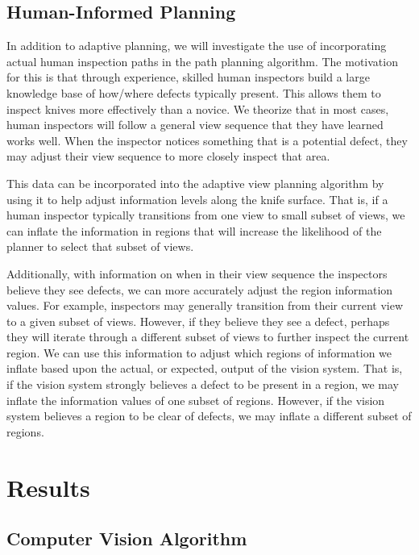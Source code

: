\documentclass[letterpaper, 10 pt, conference]{ieeeconf}  %
\begin{document}
\subsection{Human-Informed Planning}

In addition to adaptive planning, we will investigate the use of incorporating actual human inspection paths in the path planning algorithm. The motivation for this is that through experience, skilled human inspectors build a large knowledge base of how/where defects typically present. This allows them to inspect knives more effectively than a novice. We theorize that in most cases, human inspectors will follow a general view sequence that they have learned works well. When the inspector notices something that is a potential defect, they may adjust their view sequence to more closely inspect that area.

This data can be incorporated into the adaptive view planning algorithm by using it to help adjust information levels along the knife surface. That is, if a human inspector typically transitions from one view to small subset of views, we can inflate the information in regions that will increase the likelihood of the planner to select that subset of views.

Additionally, with information on when in their view sequence the inspectors believe they see defects, we can more accurately adjust the region information values. For example, inspectors may generally transition from their current view to a given subset of views. However, if they believe they see a defect, perhaps they will iterate through a different subset of views to further inspect the current region. We can use this information to adjust which regions of information we inflate based upon the actual, or expected, output of the vision system. That is, if the vision system strongly believes a defect to be present in a region, we may inflate the information values of one subset of regions. However, if the vision system believes a region to be clear of defects, we may inflate a different subset of regions.

\section{Results}

\subsection{Computer Vision Algorithm}
\end{document}
